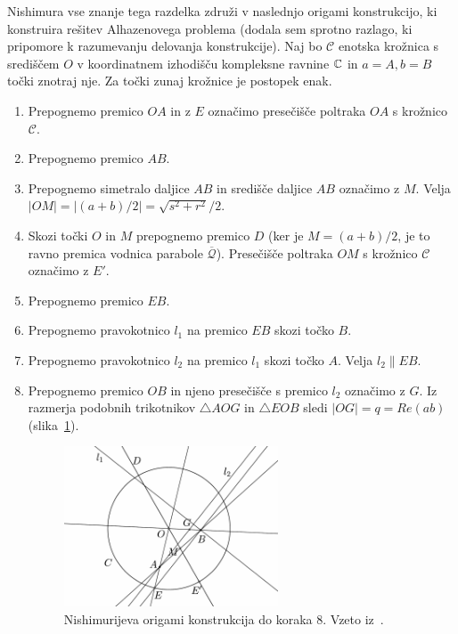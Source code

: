 Nishimura vse znanje tega razdelka združi v naslednjo origami konstrukcijo, ki konstruira rešitev Alhazenovega problema (dodala sem sprotno razlago, ki pripomore k razumevanju delovanja konstrukcije). Naj bo $\mathcal{C}$ enotska krožnica s središčem $O$ v koordinatnem izhodišču kompleksne ravnine $\mathbb C$ in $a = A, b = B$ točki znotraj nje. Za točki zunaj krožnice je postopek enak.
\begin{enumerate}
    \item Prepognemo premico $OA$ in z $E$ označimo presečišče poltraka $OA$ s krožnico~$\mathcal{C}$.
    \item Prepognemo premico $AB$.
    \item Prepognemo simetralo daljice $AB$ in središče daljice $AB$ označimo z $M$. Velja $ |OM| = |(a+b)/2| = \sqrt{s^2+r^2}/2$.
    \item Skozi točki $O$ in $M$ prepognemo premico $D$ (ker je $ M = (a+b)/2$, je to ravno premica vodnica parabole $\mathcal{\overline{Q}}$). Presečišče poltraka $OM$ s krožnico $\mathcal{C}$ označimo z $E'$.
    \item Prepognemo premico $EB$.
    \item Prepognemo pravokotnico $l_1$ na premico $EB$ skozi točko $B$.
    \item Prepognemo pravokotnico $l_2$ na premico $l_1$ skozi točko $A$. Velja $l_2 \parallel EB$.
    \item Prepognemo premico $OB$ in njeno presečišče s premico $l_2$ označimo z $G$. Iz razmerja podobnih trikotnikov $\triangle AOG$ in $\triangle EOB$ sledi $|OG| = q = Re(ab)$ (slika~\ref{fig:nishimura_origami}).
    \begin{figure}[h]
        \centering
        \includegraphics[width=0.6\textwidth]{images/alhazen/nishimura_origami.png}
        \caption[Nishimurijeva konstrukcija $1$]{Nishimurijeva origami konstrukcija do koraka $8$. Vzeto iz~\cite[str.\ 41]{nishimura2018}.}
        \label{fig:nishimura_origami}

\end{figure}
\end{enumerate}
